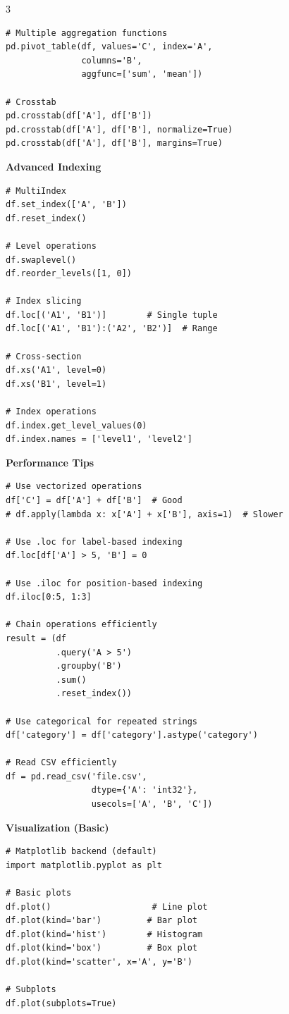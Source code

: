 \documentclass[10pt,landscape,letterpaper]{article}
\newcommand{\sect}[1]{\textbf{\color{blue}#1}}
\begin{document}
\begin{multicols}{3}
\begin{lstlisting}
# Multiple aggregation functions
pd.pivot_table(df, values='C', index='A',
               columns='B', 
               aggfunc=['sum', 'mean'])

# Crosstab
pd.crosstab(df['A'], df['B'])
pd.crosstab(df['A'], df['B'], normalize=True)
pd.crosstab(df['A'], df['B'], margins=True)
\end{lstlisting}

\sect{Advanced Indexing}
\begin{lstlisting}
# MultiIndex
df.set_index(['A', 'B'])
df.reset_index()

# Level operations
df.swaplevel()
df.reorder_levels([1, 0])

# Index slicing
df.loc[('A1', 'B1')]        # Single tuple
df.loc[('A1', 'B1'):('A2', 'B2')]  # Range

# Cross-section
df.xs('A1', level=0)
df.xs('B1', level=1)

# Index operations
df.index.get_level_values(0)
df.index.names = ['level1', 'level2']
\end{lstlisting}

\sect{Performance Tips}
\begin{lstlisting}
# Use vectorized operations
df['C'] = df['A'] + df['B']  # Good
# df.apply(lambda x: x['A'] + x['B'], axis=1)  # Slower

# Use .loc for label-based indexing
df.loc[df['A'] > 5, 'B'] = 0

# Use .iloc for position-based indexing
df.iloc[0:5, 1:3]

# Chain operations efficiently
result = (df
          .query('A > 5')
          .groupby('B')
          .sum()
          .reset_index())

# Use categorical for repeated strings
df['category'] = df['category'].astype('category')

# Read CSV efficiently
df = pd.read_csv('file.csv', 
                 dtype={'A': 'int32'},
                 usecols=['A', 'B', 'C'])
\end{lstlisting}

\sect{Visualization (Basic)}
\begin{lstlisting}
# Matplotlib backend (default)
import matplotlib.pyplot as plt

# Basic plots
df.plot()                    # Line plot
df.plot(kind='bar')         # Bar plot
df.plot(kind='hist')        # Histogram
df.plot(kind='box')         # Box plot
df.plot(kind='scatter', x='A', y='B')

# Subplots
df.plot(subplots=True)


\end{lstlisting}
\end{multicols}
\end{document}
